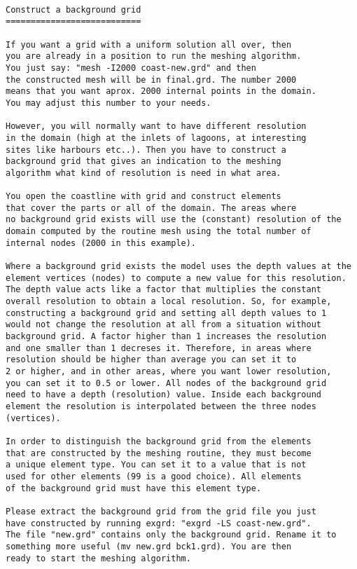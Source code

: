 \begin{verbatim}

Construct a background grid
===========================

If you want a grid with a uniform solution all over, then
you are already in a position to run the meshing algorithm.
You just say: "mesh -I2000 coast-new.grd" and then 
the constructed mesh will be in final.grd. The number 2000
means that you want aprox. 2000 internal points in the domain.
You may adjust this number to your needs.

However, you will normally want to have different resolution
in the domain (high at the inlets of lagoons, at interesting
sites like harbours etc..). Then you have to construct a
background grid that gives an indication to the meshing
algorithm what kind of resolution is need in what area.

You open the coastline with grid and construct elements
that cover the parts or all of the domain. The areas where
no background grid exists will use the (constant) resolution of the
domain computed by the routine mesh using the total number of
internal nodes (2000 in this example).

Where a background grid exists the model uses the depth values at the
element vertices (nodes) to compute a new value for this resolution.
The depth value acts like a factor that multiplies the constant
overall resolution to obtain a local resolution. So, for example,
constructing a background grid and setting all depth values to 1
would not change the resolution at all from a situation without
background grid. A factor higher than 1 increases the resolution
and one smaller than 1 decreses it. Therefore, in areas where
resolution should be higher than average you can set it to
2 or higher, and in other areas, where you want lower resolution,
you can set it to 0.5 or lower. All nodes of the background grid
need to have a depth (resolution) value. Inside each background
element the resolution is interpolated between the three nodes
(vertices).

In order to distinguish the background grid from the elements
that are constructed by the meshing routine, they must become 
a unique element type. You can set it to a value that is not
used for other elements (99 is a good choice). All elements
of the background grid must have this element type.

Please extract the background grid from the grid file you just
have constructed by running exgrd: "exgrd -LS coast-new.grd".
The file "new.grd" contains only the background grid. Rename it to
something more useful (mv new.grd bck1.grd). You are then
ready to start the meshing algorithm.


\end{verbatim}
